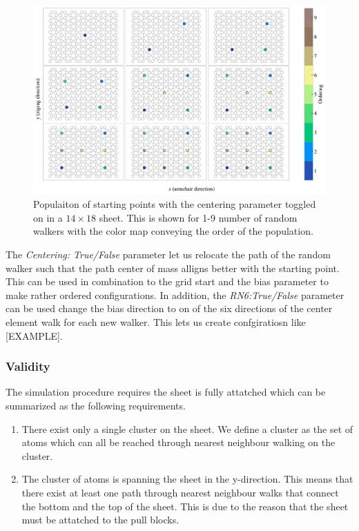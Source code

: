 \begin{figure}[H]
  \centering
  \includegraphics[width=\linewidth]{figures/system/grid_start.pdf}
  \caption{Populaiton of starting points with the centering parameter toggled on in a $14\times 18$ sheet. This is shown for 1-9 number of random walkers with the color map conveying the order of the population.}
  \label{fig:grid_start}
\end{figure}


The \textit{Centering: True/False} parameter let us relocate the path of the random walker such that the path center of mass alligns better with the starting point. This can be used in combination to the grid start and the bias parameter to make rather ordered configurations. In addition, the \textit{RN6:True/False} parameter can be used change the bias direction to on of the six directions of the center element walk for each new walker. This lets us create confgiratiosn like [EXAMPLE]. 

\subsubsection{Validity}
The simulation procedure requires the sheet is fully attatched which can be summarized as the following requirements. 
\begin{enumerate}
  \item There exist only a single cluster on the sheet. We define a cluster as the set of atoms which can all be reached through nearest neighbour walking on the cluster.
  \item The cluster of atoms is spanning the sheet in the y-direction. This means that there exist at least one path through nearest neighbour walks that connect the bottom and the top of the sheet. This is due to the reason that the sheet must be attatched to the pull blocks.
\end{enumerate}

